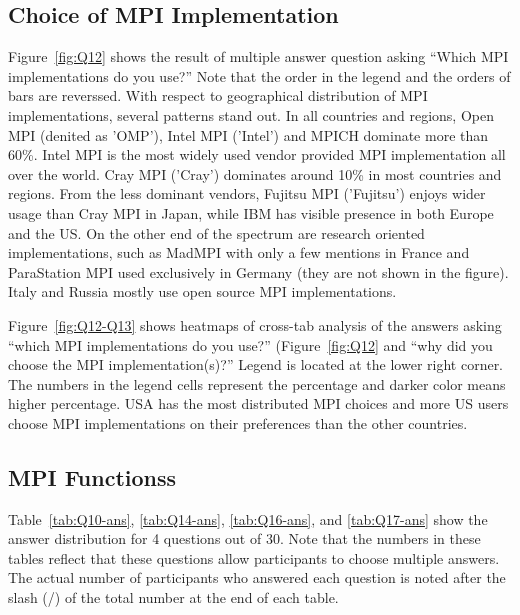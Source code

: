 \documentclass[sigconf,nonacm]{acmart}
\begin{document}
\subsection{Choice of MPI Implementation}

Figure~\ref{fig:Q12} shows the result of multiple answer question
asking ``Which MPI implementations do you use?'' Note that the order
in the legend and the orders of bars are reverssed. 
With respect to geographical distribution of MPI implementations,
several patterns stand out. In all countries and regions, Open MPI
(denited as 'OMP'),
Intel MPI ('Intel') and MPICH dominate more than 60\%. Intel MPI is
the most 
widely used vendor provided MPI implementation all over the
world. Cray MPI ('Cray') dominates around 10\% in most countries and
regions. From the less dominant vendors, Fujitsu MPI ('Fujitsu')
enjoys wider usage than Cray MPI in Japan, while IBM has visible
presence in both Europe and the US. 
On the other end of the spectrum are research oriented
implementations, such as MadMPI with only a few mentions in
France and ParaStation MPI used exclusively in
Germany (they are not shown in the figure). Italy and Russia mostly
use open source MPI implementations.

Figure~\ref{fig:Q12-Q13} shows heatmaps of cross-tab analysis of the
answers asking ``which MPI implementations do you use?''
(Figure~\ref{fig:Q12} and ``why did you choose the MPI
implementation(s)?'' Legend is located at the lower right
corner. The numbers in the legend cells represent the
percentage and darker color means higher percentage. USA has the most
distributed MPI choices and more US users choose MPI implementations
on their preferences than the other countries.

\subsection{MPI Functionss}

Table~\ref{tab:Q10-ans}, \ref{tab:Q14-ans}, \ref{tab:Q16-ans}, and
\ref{tab:Q17-ans} show the answer distribution for 4 questions out of
30. Note that the numbers in these tables reflect that these questions
allow participants to choose multiple answers. 
The actual number of participants who answered
each question is noted after the slash (/) of the total number
at the end of each table.
\end{document}
